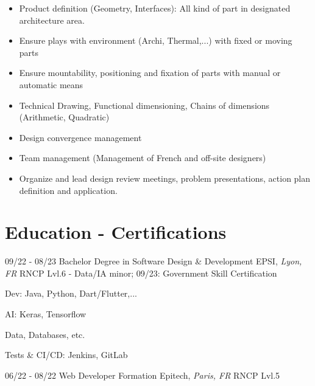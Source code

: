\documentclass[]{friggeri-cv}
\begin{document}
\vspace{0.5mm}
\begin{itemize}
\setlength{\itemsep}{1pt}
\setlength{\parskip}{0pt}
\setlength{\parsep}{0pt}

\item Product definition (Geometry, Interfaces): All kind of part in designated architecture area.
\item Ensure plays with environment (Archi, Thermal,...) with fixed or moving parts
\item Ensure mountability, positioning and fixation of parts with manual or automatic means
\item Technical Drawing, Functional dimensioning, Chains of dimensions (Arithmetic, Quadratic)
\item Design convergence management
\item Team management (Management of French and off-site designers)
\item Organize and lead design review meetings, problem presentations, action plan definition and application.
\end{itemize}

\vspace*{-0.5cm}
\vspace*{0.45cm}
\section{Education - Certifications}
\vspace*{-0.25cm}
\vspace{0.5mm}
\begin{entrylist}
  \entry
    {09/22 - 08/23}
    {Bachelor Degree in Software Design \& Development}
    {EPSI, \textit{Lyon, FR}}
    {RNCP Lvl.6 - Data/IA minor; \hspace{7mm} 09/23: Government Skill Certification}
\end{entrylist}
\vspace*{-0.65cm}
\begin{itemize}
\setlength{\itemsep}{1pt}
\setlength{\parskip}{0pt}
\setlength{\parsep}{0pt}
\begin{multicols}{2}
\item Dev: Java, Python, Dart/Flutter,...
\item AI: Keras, Tensorflow
\columnbreak
\item Data, Databases, etc.
\item Tests \& CI/CD: Jenkins, GitLab
\end{multicols}
\end{itemize}\vspace{0.5mm}
\begin{entrylist}
  \entry
    {06/22 - 08/22}
    {Web Developer Formation}
    {Epitech, \textit{Paris, FR}}
    {RNCP Lvl.5}
\end{entrylist}
\end{document}
